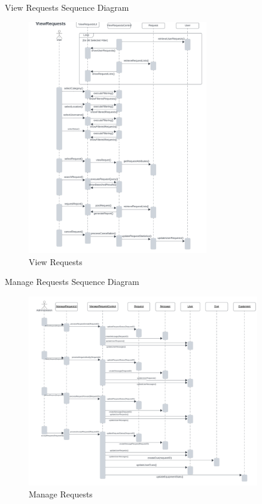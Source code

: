 \documentclass[20pt]{beamer}
\numberwithin{figure}{section}
\begin{document}
\begin{frame}{View Requests Sequence Diagram}

     \begin{figure}
        \centering
        \includegraphics[width= 0.7\textwidth , height= 0.8\paperheight]{ViewRequestsSeq.png}
        \caption{View Requests}
        \label{fig:32}
    \end{figure}

\end{frame}

\begin{frame}{Manage Requests Sequence Diagram}

     \begin{figure}
        \centering
        \includegraphics[width= 0.9\textwidth , height= 0.6\paperheight]{ManageRequestSeq.png}
        \caption{Manage Requests}
        \label{fig:33}
    \end{figure}

\end{frame}
\end{document}
